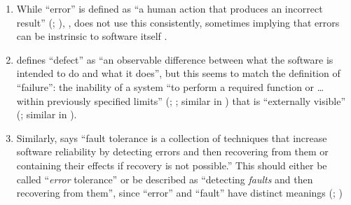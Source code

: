 \begin{enumerate}
    \item %
          While ``error'' is defined as ``a human action that produces an incorrect
          result'' \ifnotpaper (\citealp[pp.~12\=/3]{SWEBOK2024};
              \citealp[p.~399]{vanVliet2000})\else \cite[pp.~12\=/3]{SWEBOK2024},
              \cite[p.~399]{vanVliet2000}\fi, \citeauthor{SWEBOK2024} does not
          use this consistently, sometimes implying that errors can be instrinsic
          to software itself \citeyearpar[pp.~4\=/9, 6\=/5, 7\=/3, 12\=/4,
              12\=/9, 12\=/13]{SWEBOK2024}.
    \item %
           \citet[p.~1\=/1]{SWEBOK2024} defines ``defect'' as ``an
          observable difference between what the software is intended to do and
          what it does'', but this seems to match the definition of
          ``failure'': the inability of a system ``to perform a required
          function or \dots{} within previously specified limits'' \ifnotpaper
              (\citealp[p.~7]{IEEE2019}; \citeyear[p.~139]{IEEE2010}%
              ; similar in \citealp[p.~400]{vanVliet2000})
           \fi that is ``externally visible''
          \ifnotpaper (\citealp[p.~7]{IEEE2019}; similar in
              \citealp[p.~400]{vanVliet2000})\fi.
    \item %
          Similarly, \citet[p.~4\=/11]{SWEBOK2024} says ``fault tolerance is
          a collection of techniques that increase software reliability by
          detecting errors and then recovering from them or containing their
          effects if recovery is not possible.'' This should either be called
          ``\emph{error} tolerance'' or be described as ``detecting
          \emph{faults} and then recovering from them'', since ``error'' and
          ``fault'' have distinct meanings \ifnotpaper
              (\citealp[p.~5\=/3]{SWEBOK2024};
              \citealp[pp.~399--400]{vanVliet2000})\else

\end{enumerate}
